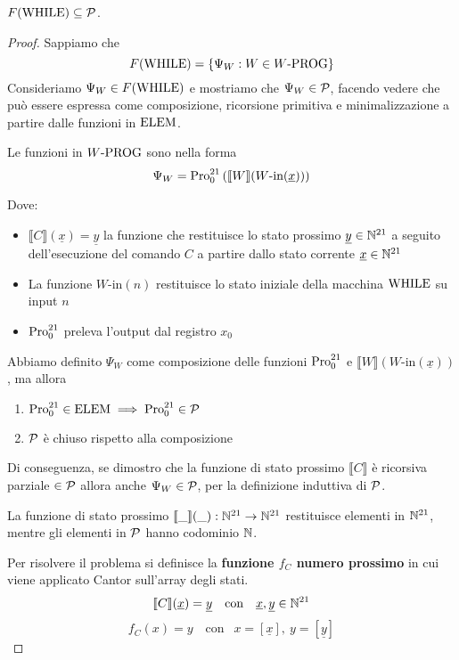 \begin{theor}
	$F(\text{WHILE}) \subseteq \mathcal{P}$.
\end{theor}
\begin{proof}
	Sappiamo che
	$$ F(\text{WHILE}) = \{\Psi_W: W \in W\text{-PROG}\}$$
	Consideriamo $\Psi_W \in F(\text{WHILE})$ e mostriamo che $\Psi_W \in \mathcal{P}$, facendo vedere che può essere espressa come composizione, ricorsione primitiva e minimalizzazione a partire dalle funzioni in $\text{ELEM}$.
	
	Le funzioni in $W\text{-PROG}$ sono nella forma
	$$ \Psi_W = \text{Pro}_0^{21} \left( \llbracket W \rrbracket (W\text{-in}(\underline{x})) \right) $$
    
	Dove: 
	\begin{itemize}
		\item $\llbracket C \rrbracket (\underline{x}) = \underline{y}$ la funzione che restituisce lo stato prossimo $\underline{y} \in \mathbb{N}^{21}$ a seguito dell'esecuzione del comando $C$ a partire dallo stato corrente $\underline{x} \in \mathbb{N}^{21}$
		
		\item La funzione $W\text{-in}(n)$ restituisce lo stato iniziale della macchina $\text{WHILE}$ su input $n$
		
		\item $\text{Pro}_0^{21}$ preleva l'output dal registro $x_0$
	\end{itemize}
	
	Abbiamo definito $\Psi_W$ come composizione delle funzioni $\text{Pro}_0^{21}$ e $\llbracket W \rrbracket (W\text{-in}(\underline{x}))$, ma allora
	\begin{enumerate}
		\item $\text{Pro}_0^{21} \in \text{ELEM} \implies \text{Pro}_0^{21} \in \mathcal{P}$
		\item $\mathcal{P}$ è chiuso rispetto alla composizione
	\end{enumerate}
	Di conseguenza, se dimostro che la funzione di stato prossimo $\llbracket C \rrbracket$ è ricorsiva parziale $\in \mathcal{P}$ allora anche $\Psi_W \in \mathcal{P}$, per la definizione induttiva di $\mathcal{P}$.
	
	La funzione di stato prossimo $\llbracket \_ \rrbracket (\_): \mathbb{N}^{21} \rightarrow \mathbb{N}^{21}$ restituisce elementi in $\mathbb{N}^{21}$, mentre gli elementi in $\mathcal{P}$ hanno codominio $\mathbb{N}$.
	
	Per risolvere il problema si definisce la \textbf{funzione $f_C$ numero prossimo} in cui viene applicato Cantor sull'array degli stati.
	$$ \llbracket C \rrbracket (\underline{x}) = \underline{y} \quad \text{con }
	\ \ \underline{x},\underline{y}\in \mathbb{N}^{21}$$
	$$ f_C(x)=y \quad \text{con }
	\ \ x=[ \underline{x} ] ,\ y= [ \underline{y} ] $$
	

\end{proof}

